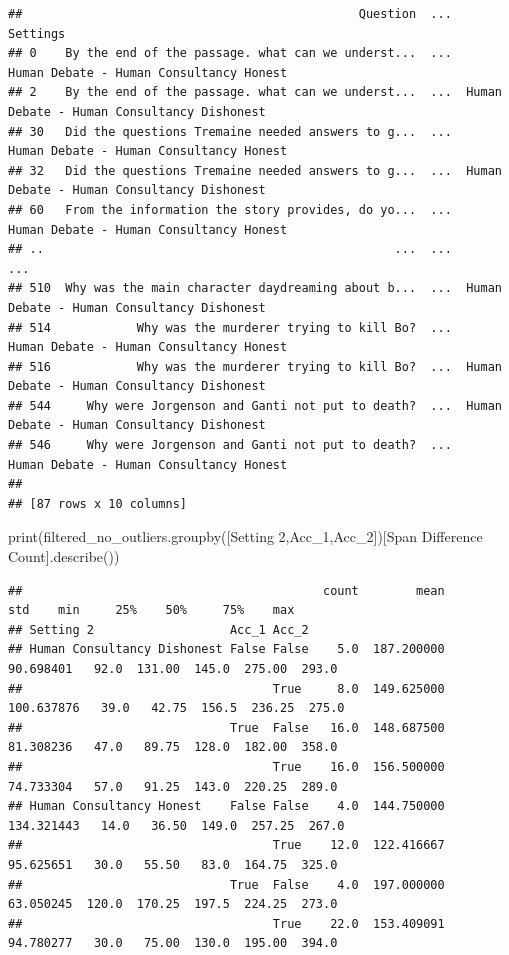 \documentclass[
]{article}
\newenvironment{Shaded}{\begin{snugshade}}{\end{snugshade}}
\newcommand{\BuiltInTok}[1]{#1}
\newcommand{\NormalTok}[1]{#1}
\newcommand{\StringTok}[1]{\textcolor[rgb]{0.31,0.60,0.02}{#1}}
\begin{document}
\begin{verbatim}
##                                               Question  ...                                    Settings
## 0    By the end of the passage. what can we underst...  ...     Human Debate - Human Consultancy Honest
## 2    By the end of the passage. what can we underst...  ...  Human Debate - Human Consultancy Dishonest
## 30   Did the questions Tremaine needed answers to g...  ...     Human Debate - Human Consultancy Honest
## 32   Did the questions Tremaine needed answers to g...  ...  Human Debate - Human Consultancy Dishonest
## 60   From the information the story provides, do yo...  ...     Human Debate - Human Consultancy Honest
## ..                                                 ...  ...                                         ...
## 510  Why was the main character daydreaming about b...  ...  Human Debate - Human Consultancy Dishonest
## 514            Why was the murderer trying to kill Bo?  ...     Human Debate - Human Consultancy Honest
## 516            Why was the murderer trying to kill Bo?  ...  Human Debate - Human Consultancy Dishonest
## 544     Why were Jorgenson and Ganti not put to death?  ...  Human Debate - Human Consultancy Dishonest
## 546     Why were Jorgenson and Ganti not put to death?  ...     Human Debate - Human Consultancy Honest
## 
## [87 rows x 10 columns]
\end{verbatim}

\begin{Shaded}
\begin{Highlighting}[]
\BuiltInTok{print}\NormalTok{(filtered\_no\_outliers.groupby([}\StringTok{\textquotesingle{}Setting 2\textquotesingle{}}\NormalTok{,}\StringTok{\textquotesingle{}Acc\_1\textquotesingle{}}\NormalTok{,}\StringTok{\textquotesingle{}Acc\_2\textquotesingle{}}\NormalTok{])[}\StringTok{\textquotesingle{}Span Difference Count\textquotesingle{}}\NormalTok{].describe())}
\end{Highlighting}
\end{Shaded}

\begin{verbatim}
##                                          count        mean         std    min     25%    50%     75%    max
## Setting 2                   Acc_1 Acc_2                                                                    
## Human Consultancy Dishonest False False    5.0  187.200000   90.698401   92.0  131.00  145.0  275.00  293.0
##                                   True     8.0  149.625000  100.637876   39.0   42.75  156.5  236.25  275.0
##                             True  False   16.0  148.687500   81.308236   47.0   89.75  128.0  182.00  358.0
##                                   True    16.0  156.500000   74.733304   57.0   91.25  143.0  220.25  289.0
## Human Consultancy Honest    False False    4.0  144.750000  134.321443   14.0   36.50  149.0  257.25  267.0
##                                   True    12.0  122.416667   95.625651   30.0   55.50   83.0  164.75  325.0
##                             True  False    4.0  197.000000   63.050245  120.0  170.25  197.5  224.25  273.0
##                                   True    22.0  153.409091   94.780277   30.0   75.00  130.0  195.00  394.0
\end{verbatim}
\end{document}
